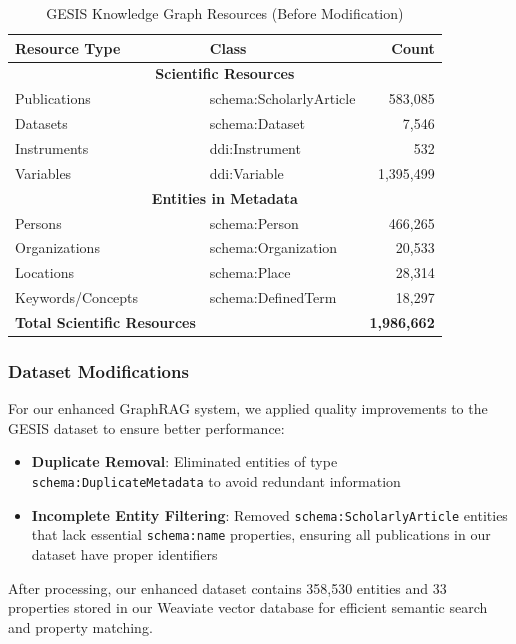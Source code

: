 \begin{table}[htbp]
\centering
\renewcommand{\arraystretch}{1.15}
\setlength{\tabcolsep}{12pt}
\begin{tabular}{| l | l | r |}
\hline
\textbf{Resource Type} & \textbf{Class} & \textbf{Count} \\
\hline
\multicolumn{3}{|c|}{\textbf{Scientific Resources}} \\
\hline
Publications & schema:ScholarlyArticle & 583,085 \\
Datasets & schema:Dataset & 7,546 \\
Instruments & ddi:Instrument & 532 \\
Variables & ddi:Variable & 1,395,499 \\
\hline
\multicolumn{3}{|c|}{\textbf{Entities in Metadata}} \\
\hline
Persons & schema:Person & 466,265 \\
Organizations & schema:Organization & 20,533 \\
Locations & schema:Place & 28,314 \\
Keywords/Concepts & schema:DefinedTerm & 18,297 \\
\hline
\textbf{Total Scientific Resources} & & \textbf{1,986,662} \\
\hline
\end{tabular}
\caption{GESIS Knowledge Graph Resources (Before Modification)}
\label{table-gesis-resources}
\end{table}

\subsubsection{Dataset Modifications}
For our enhanced GraphRAG system, we applied quality improvements to the GESIS dataset to ensure better performance:

\begin{itemize}
    \item \textbf{Duplicate Removal}: Eliminated entities of type \texttt{schema:DuplicateMetadata} to avoid redundant information
    \item \textbf{Incomplete Entity Filtering}: Removed \texttt{schema:ScholarlyArticle} entities that lack essential \texttt{schema:name} properties, ensuring all publications in our dataset have proper identifiers
\end{itemize}

After processing, our enhanced dataset contains 358,530 entities and 33 properties stored in our Weaviate vector database for efficient semantic search and property matching.


